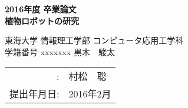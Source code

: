 
%
%

%

\begin{titlepage}
\vspace*{2cm}
\begin{center}
{\Large\bf 2016年度 卒業論文}\\
\vspace{1cm}
{\LARGE\bf 植物ロボットの研究}

\vspace{3cm}
{\Large 
東海大学 情報理工学部 コンピュータ応用工学科}\\

\vspace{1cm}
{\large
学籍番号 xxxxxxx \hspace{5mm} 黒木　駿太}\\


\vspace{1cm}
\begin{tabular}{rl}
\hspace{15mm}{\large 指導教員}
		:& {\large 村松　聡}
\\
\hspace{9mm}提出年月日:& 2016年2月\\
\end{tabular}
\end{center}
\end{titlepage}

\normalsize
\pagestyle{plain}

\tableofcontents
\listoffigures
\listoftables


%
%
%
%
%
%
%


